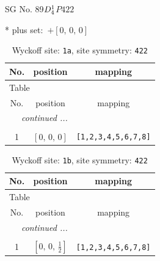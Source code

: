 \documentclass[fleqn,8pt]{jsarticle}
\begin{document}
\setcounter{MaxMatrixCols}{32}

\renewcommand{\tablename}{Table~}
\renewcommand{\figurename}{Figure~}
\begin{center}
\LARGE
SG No. 89\quad$D_{\rm 4}^{1}$\quad$P422$\quad[ tetragonal ]
\end{center}
* plus set:\,\,\,$+\left[ 0,\, 0,\, 0 \right]$
\renewcommand{\arraystretch}{1.2}
\begin{longtable}{ccc}
\caption{Wyckoff site: {\tt 1a}, site symmetry: {\tt 422}}
 \\
 \hline \hline
No. & position & mapping \\ \hline \endfirsthead

\multicolumn{2}{l}{\tablename\ \thetable{}} \\
 \hline \hline
No. & position & mapping \\ \hline \endhead

 \hline \hline
\multicolumn{2}{r}{\footnotesize\it continued ...} \\ \endfoot

 \hline \hline
\multicolumn{2}{r}{} \\ \endlastfoot

1 & $\left[ 0,\, 0,\, 0 \right]$ & {\tt [1,2,3,4,5,6,7,8]} \\
\end{longtable}
\renewcommand{\arraystretch}{1.2}
\begin{longtable}{ccc}
\caption{Wyckoff site: {\tt 1b}, site symmetry: {\tt 422}}
 \\
 \hline \hline
No. & position & mapping \\ \hline \endfirsthead

\multicolumn{2}{l}{\tablename\ \thetable{}} \\
 \hline \hline
No. & position & mapping \\ \hline \endhead

 \hline \hline
\multicolumn{2}{r}{\footnotesize\it continued ...} \\ \endfoot

 \hline \hline
\multicolumn{2}{r}{} \\ \endlastfoot

1 & $\left[ 0,\, 0,\, \frac{1}{2} \right]$ & {\tt [1,2,3,4,5,6,7,8]} \\
\end{longtable}
\renewcommand{\arraystretch}{1.2}
\end{document}
